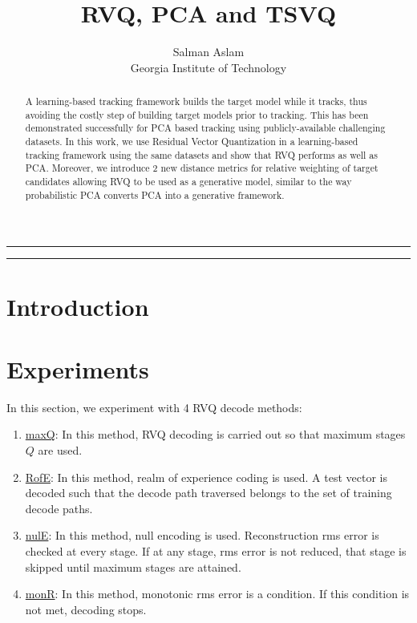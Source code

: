 
\title{RVQ, PCA and TSVQ}
\author{Salman Aslam\\ Georgia Institute of Technology}
\date{}


\maketitle
\rule[0pt]{\textwidth}{1pt}
\tableofcontents
\rule[0pt]{\textwidth}{1pt}


\begin{abstract}
A learning-based tracking framework builds the target model while it tracks, thus avoiding the costly step of building target models prior to tracking.  This has been demonstrated successfully for PCA based tracking using publicly-available challenging datasets.  In this work, we use Residual Vector Quantization in a learning-based tracking framework using the same datasets and show that RVQ performs as well as PCA.  Moreover, we introduce 2 new distance metrics for relative weighting of target candidates allowing RVQ to be used as a generative model, similar to the way probabilistic PCA converts PCA into a generative framework.
\end{abstract}

\section{Introduction}




\section{Experiments}
In this section, we experiment with 4 RVQ decode methods:

\begin{enumerate}
\item \underline{maxQ}: In this method, RVQ decoding is carried out so that maximum stages $Q$ are used.
\item \underline{RofE}: In this method, realm of experience coding is used.  A test vector is decoded such that the decode path traversed belongs to the set of training decode paths.
\item \underline{nulE}: In this method, null encoding is used.  Reconstruction rms error is checked at every stage.  If at any stage, rms error is not reduced, that stage is skipped until maximum stages are attained.
\item \underline{monR}: In this method, monotonic rms error is a condition.  If this condition is not met, decoding stops.
\end{enumerate}

